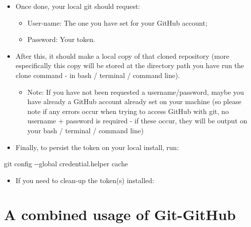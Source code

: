 \documentclass[
]{book}
\newenvironment{Shaded}{\begin{snugshade}}{\end{snugshade}}
\newcommand{\AttributeTok}[1]{\textcolor[rgb]{0.77,0.63,0.00}{#1}}
\newcommand{\ExtensionTok}[1]{#1}
\newcommand{\FunctionTok}[1]{\textcolor[rgb]{0.00,0.00,0.00}{#1}}
\newcommand{\NormalTok}[1]{#1}
\providecommand{\tightlist}{%
  \setlength{\itemsep}{0pt}\setlength{\parskip}{0pt}}
\begin{document}
\begin{itemize}
\tightlist
\item
  Once done, your local git should request:

  \begin{itemize}
  \tightlist
  \item
    User-name: The one you have set for your GitHub account;
  \item
    Password: Your token.
  \end{itemize}
\item
  After this, it should make a local copy of that cloned repository (more
  especifically this copy will be stored at the directory path you have run the
  clone command - in bash / terminal / command line).

  \begin{itemize}
  \tightlist
  \item
    Note: If you have not been requested a username/password, maybe you have already
    a GitHub account already set on your machine (so please note if any errors occur
    when trying to access GitHub with git, no username + password is required -
    if these occur, they will be output on your bash / terminal / command line)
  \end{itemize}
\item
  Finally, to persist the token on your local install, run:
\end{itemize}

\begin{Shaded}
\begin{Highlighting}[]
\FunctionTok{git}\NormalTok{ config }\AttributeTok{{-}{-}global}\NormalTok{ credential.helper cache}
\end{Highlighting}
\end{Shaded}

\begin{itemize}
\tightlist
\item
  If you need to clean-up the token(s) installed:
\end{itemize}

\begin{Shaded}
\end{Shaded}

\hypertarget{a-combined-usage-of-git-github}{%
\section{A combined usage of Git-GitHub}\label{a-combined-usage-of-git-github}}
\end{document}
